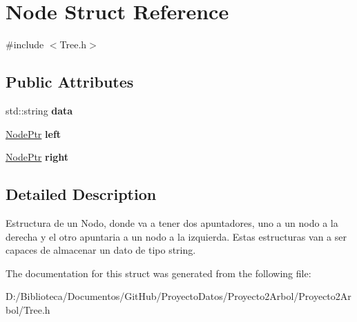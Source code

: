 \hypertarget{struct_node}{}\section{Node Struct Reference}
\label{struct_node}


{\ttfamily \#include $<$Tree.\+h$>$}

\subsection*{Public Attributes}
\begin{DoxyCompactItemize}
\item 
\mbox{\label{struct_node_a85af1fa0eeeecfa52b94c50674fb2129}} 
std\+::string {\bfseries data}
\item 
\mbox{\label{struct_node_a549253d765a467b4a303b849868e56c9}} 
\mbox{\hyperlink{struct_node}{Node\+Ptr}} {\bfseries left}
\item 
\mbox{\label{struct_node_ae3bff8826cc8ff078cba898e88e9711a}} 
\mbox{\hyperlink{struct_node}{Node\+Ptr}} {\bfseries right}
\end{DoxyCompactItemize}


\subsection{Detailed Description}
Estructura de un Nodo, donde va a tener dos apuntadores, uno a un nodo a la derecha y el otro apuntaria a un nodo a la izquierda. Estas estructuras van a ser capaces de almacenar un dato de tipo string. 

The documentation for this struct was generated from the following file\+:\begin{DoxyCompactItemize}
\item 
D\+:/\+Biblioteca/\+Documentos/\+Git\+Hub/\+Proyecto\+Datos/\+Proyecto2\+Arbol/\+Proyecto2\+Arbol/Tree.\+h\end{DoxyCompactItemize}
